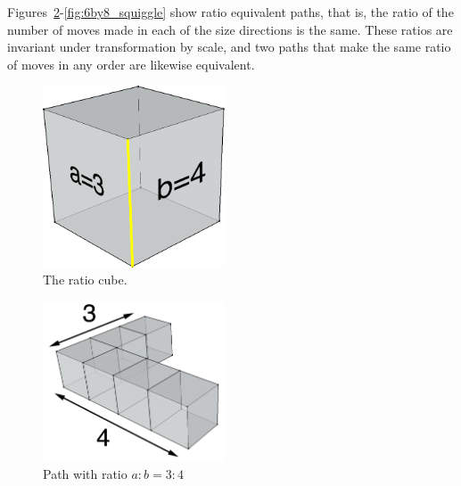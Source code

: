 Figures~\ref{fig:3by4}-\ref{fig:6by8_squiggle} show ratio equivalent paths, that is, the ratio of the number of moves made in each of the size directions is the same.
These ratios are invariant under transformation by scale, and two paths that make the same ratio of moves in any order are likewise equivalent.




\begin{figure}
  \centering
  \includegraphics[width=0.48\textwidth]{./figures/ratioCube_3_4}
		\caption{The ratio cube.}
		\label{fig:ratioCube}
\end{figure}
\begin{figure}
  \centering
  \includegraphics[width=0.48\textwidth]{./figures/3by4}
    \caption{Path with ratio $a:b = 3:4$}
		\label{fig:3by4}
\end{figure}


